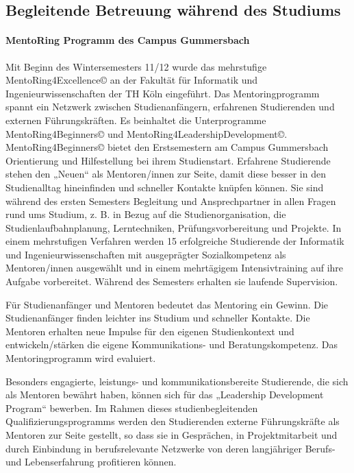 \subsection{Begleitende Betreuung während des
Studiums\label{/mi-2017/selbstbericht/0100-ist-zustand/0100-ist-zustand}}\label{begleitende-betreuung-wuxe4hrend-des-studiumspathlabelmi-2017selbstbericht0100-ist-zustand0100-ist-zustand}

\paragraph{MentoRing Programm des Campus
Gummersbach\label{/mi-2017/selbstbericht/0100-ist-zustand/0100-ist-zustand}}\label{mentoring-programm-des-campus-gummersbachpathlabelmi-2017selbstbericht0100-ist-zustand0100-ist-zustand}

Mit Beginn des Wintersemesters 11/12 wurde das mehrstufige
MentoRing4Excellence© an der Fakultät für Informatik und
Ingenieurwissenschaften der TH Köln eingeführt. Das Mentoringprogramm
spannt ein Netzwerk zwischen Studienanfängern, erfahrenen Studierenden
und externen Führungskräften. Es beinhaltet die Unterprogramme
MentoRing4Beginners© und MentoRing4LeadershipDevelopment©.
MentoRing4Beginners© bietet den Erstsemestern am Campus Gummersbach
Orientierung und Hilfestellung bei ihrem Studienstart. Erfahrene
Studierende stehen den „Neuen`` als Mentoren/innen zur Seite, damit
diese besser in den Studienalltag hineinfinden und schneller Kontakte
knüpfen können. Sie sind während des ersten Semesters Begleitung und
Ansprechpartner in allen Fragen rund ums Studium, z. B. in Bezug auf die
Studienorganisation, die Studienlaufbahnplanung, Lerntechniken,
Prüfungsvorbereitung und Projekte. In einem mehrstufigen Verfahren
werden 15 erfolgreiche Studierende der Informatik und
Ingenieurwissenschaften mit ausgeprägter Sozialkompetenz als
Mentoren/innen ausgewählt und in einem mehrtägigem Intensivtraining auf
ihre Aufgabe vorbereitet. Während des Semesters erhalten sie laufende
Supervision.

Für Studienanfänger und Mentoren bedeutet das Mentoring ein Gewinn. Die
Studienanfänger finden leichter ins Studium und schneller Kontakte. Die
Mentoren erhalten neue Impulse für den eigenen Studienkontext und
entwickeln/stärken die eigene Kommunikations- und Beratungskompetenz.
Das Mentoringprogramm wird evaluiert.

Besonders engagierte, leistungs- und kommunikationsbereite Studierende,
die sich als Mentoren bewährt haben, können sich für das „Leadership
Development Program`` bewerben. Im Rahmen dieses studienbegleitenden
Qualifizierungsprogramms werden den Studierenden externe Führungskräfte
als Mentoren zur Seite gestellt, so dass sie in Gesprächen, in
Projektmitarbeit und durch Einbindung in berufsrelevante Netzwerke von
deren langjähriger Berufs- und Lebenserfahrung profitieren können.

